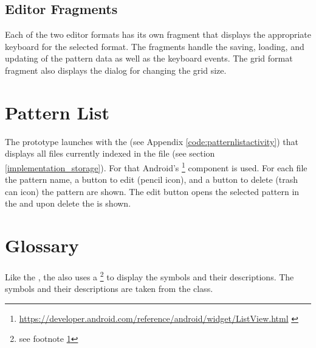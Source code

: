 \subsection*{Editor Fragments}
Each of the two editor formats has its own fragment that displays the appropriate keyboard for the selected format. The fragments handle the saving, loading, and updating of the pattern data as well as the keyboard events. The grid format fragment also displays the dialog for changing the grid size.

\section{Pattern List}
The prototype launches with the  (see Appendix \ref{code:patternlistactivity}) that displays all files currently indexed in the  file (see section \ref{implementation_storage}). For that Android's \footnote{\url{https://developer.android.com/reference/android/widget/ListView.html} \label{url_footnote}} component is used. For each file the pattern name, a button to edit (pencil icon), and a button to delete (trash can icon) the pattern are shown. The edit button opens the selected pattern in the  and upon delete the  is shown.

\section{Glossary}
Like the , the  also uses a \footnote{see footnote \ref{url_footnote}} to display the symbols and their descriptions. The symbols and their descriptions are taken from the  class.


